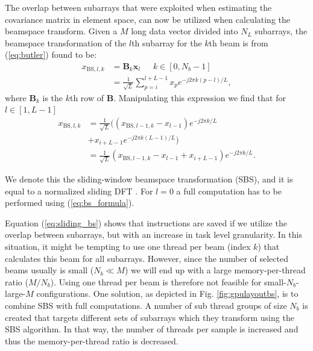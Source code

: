 \documentclass[journal]{IEEEtran}
\newcommand{\mat}[1]{\mathbf{#1}}
\renewcommand{\vec}[1]{\mathbf{#1}}
\begin{document}
The overlap between subarrays that were exploited when estimating the covariance matrix in element space, can now be utilized when calculating the beamspace transform. 
Given a $M$ long data vector divided into $N_L$ subarrays, the beamspace transformation of the $l$th subarray for the $k$th beam is from (\ref{eq:butler}) found to be:
\begin{align}\label{eq:bs_formula}
x_{\text{BS},l,k} &= \mat{B}_k\vec{x}_l \,\,\,\,\,\,\,\,\, k \in [0, N_b-1] \\
&= \frac{1}{\sqrt{L}}\sum_{p=i}^{l+L-1}x_p e^{-j2\pi k(p-l)/L},
\end{align}
where $\mat{B}_k$ is the $k$th row of $\mat{B}$. Manipulating this expression we find that for $l \in [1, L-1]$
\begin{align}\label{eq:sliding_bs}
x_{\text{BS},l,k} &= \frac{1}{\sqrt{L}}((x_{\text{BS},l-1,k} - x_{l-1})e^{-j2\pi k/L} \nonumber \\ &+ x_{i+L-1}e^{-j2\pi k(L-1)/L}) \nonumber \\
&= \frac{1}{\sqrt{L}}(x_{\text{BS},l-1,k} - x_{l-1} + x_{i+L-1})e^{-j2\pi k/L}.
\end{align}

We denote this the sliding-window beamspace transformation (SBS), and it is equal to a normalized sliding DFT \cite{Lyons2003}. For $l=0$ a full computation has to be performed using (\ref{eq:bs_formula}).

Equation (\ref{eq:sliding_bs}) shows that instructions are saved if we utilize the overlap between subarrays, but with an increase in task level granularity. In this situation, it might be tempting to use one thread per beam (index $k$) that calculates this beam for all subarrays. However, since the number of selected beams usually is small ($N_b \ll M$) we will end up with a large memory-per-thread ratio ($M/N_b$). Using one thread per beam is therefore not feasible for small-$N_b$-large-$M$ configurations. One solution, as depicted in Fig. \ref{fig:gpulayoutbs}, is to combine SBS with full computations. A number of sub thread groups of size $N_b$ is created that targets different sets of subarrays which they transform using the SBS algorithm. In that way, the number of threads per sample is increased and thus the memory-per-thread ratio is decreased. 
\end{document}
